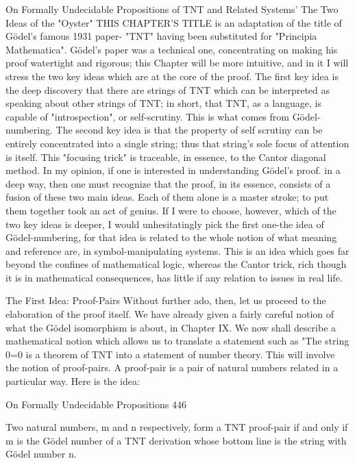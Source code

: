                          On Formally Undecidable
                           Propositions of TNT
                          and Related Systems'
                           The Two Ideas of the "Oyster"
THIS CHAPTER'S TITLE is an adaptation of the title of Gödel’s famous 1931 paper-
"TNT" having been substituted for "Principia Mathematica". Gödel’s paper was a
technical one, concentrating on making his proof watertight and rigorous; this Chapter
will be more intuitive, and in it I will stress the two key ideas which are at the core of the
proof. The first key idea is the deep discovery that there are strings of TNT which can be
interpreted as speaking about other strings of TNT; in short, that TNT, as a language, is
capable of "introspection", or self-scrutiny. This is what comes from Gödel-numbering.
The second key idea is that the property of self scrutiny can be entirely concentrated into
a single string; thus that string's sole focus of attention is itself. This "focusing trick" is
traceable, in essence, to the Cantor diagonal method.
        In my opinion, if one is interested in understanding Gödel’s proof. in a deep way,
then one must recognize that the proof, in its essence, consists of a fusion of these two
main ideas. Each of them alone is a master stroke; to put them together took an act of
genius. If I were to choose, however, which of the two key ideas is deeper, I would
unhesitatingly pick the first one-the idea of Gödel-numbering, for that idea is related to
the whole notion of what meaning and reference are, in symbol-manipulating systems.
This is an idea which goes far beyond the confines of mathematical logic, whereas the
Cantor trick, rich though it is in mathematical consequences, has little if any relation to
issues in real life.

                             The First Idea: Proof-Pairs
Without further ado, then, let us proceed to the elaboration of the proof itself. We have
already given a fairly careful notion of what the Gödel isomorphism is about, in Chapter
IX. We now shall describe a mathematical notion which allows us to translate a statement
such as "The string 0=0 is a theorem of TNT into a statement of number theory. This will
involve the notion of proof-pairs. A proof-pair is a pair of natural numbers related in a
particular way. Here is the idea:




On Formally Undecidable Propositions                                                       446

   Two natural numbers, m and n respectively, form a TNT proof-pair if and only if m
   is the Gödel number of a TNT derivation whose bottom line is the string with
   Gödel number n.

